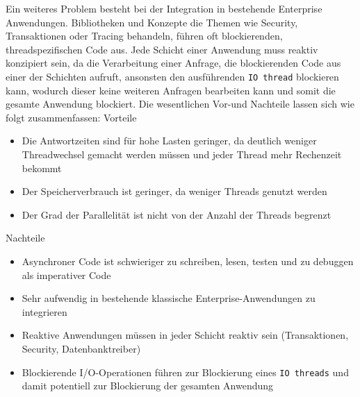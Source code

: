 Ein weiteres Problem besteht bei der Integration in bestehende Enterprise Anwendungen.
Bibliotheken und Konzepte die Themen wie Security, Transaktionen oder Tracing behandeln, führen oft blockierenden, threadspezifischen Code aus.
Jede Schicht einer Anwendung muss reaktiv konzipiert sein, da die Verarbeitung einer Anfrage, die blockierenden Code aus einer der
Schichten aufruft, ansonsten den ausführenden \verb|IO thread| blockieren kann, wodurch dieser keine weiteren Anfragen bearbeiten kann und somit die
gesamte Anwendung blockiert.
\newline\newline
Die wesentlichen Vor-und Nachteile lassen sich wie folgt zusammenfassen:
\newline
\newline
Vorteile
\begin{itemize}
  \item Die Antwortzeiten sind für hohe Lasten geringer, da deutlich weniger Threadwechsel gemacht werden müssen und jeder Thread
        mehr Rechenzeit bekommt
  \item Der Speicherverbrauch ist geringer, da weniger Threads genutzt werden
  \item Der Grad der Parallelität ist nicht von der Anzahl der Threads begrenzt
\end{itemize}
Nachteile
\begin{itemize}
  \item Asynchroner Code ist schwieriger zu schreiben, lesen, testen und zu debuggen als imperativer Code
  \item Sehr aufwendig in bestehende klassische Enterprise-Anwendungen zu integrieren
  \item Reaktive Anwendungen müssen in jeder Schicht reaktiv sein (Transaktionen, Security, Datenbanktreiber)
  \item Blockierende I/O-Operationen führen zur Blockierung eines \verb|IO threads| und damit potentiell zur Blockierung der gesamten Anwendung
\end{itemize}
\newpage
